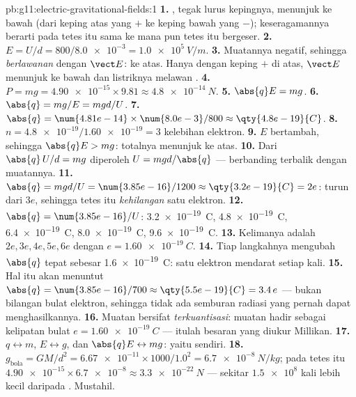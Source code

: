 \begin{solution}{pb:g11:electric-gravitational-fields:1}
\textbf{1.} , tegak lurus kepingnya, menunjuk ke bawah (dari
keping atas yang $+$ ke keping bawah yang $-$); keseragamannya berarti
 pada tetes itu sama ke mana pun tetes itu bergeser.
\textbf{2.} $E = U/d = 800 / \num{8.0e-3} = \qty{1.0e5}{V/m}$.
\textbf{3.} Muatannya negatif, sehingga  \emph{berlawanan}
dengan $\vect E$: ke atas. Hanya dengan keping $+$ di atas, $\vect E$
menunjuk ke bawah dan  listriknya melawan .
\textbf{4.} $P = mg = \num{4.90e-15} \times 9.81 \approx
\qty{4.8e-14}{N}$.
\textbf{5.} $\abs{q}E = mg$.
\textbf{6.} $\abs{q} = mg/E = mgd/U$.
\textbf{7.} $\abs{q} = \num{4.81e-14} \times \num{8.0e-3} / 800
\approx \qty{4.8e-19}{C}$.
\textbf{8.} $n = \num{4.8e-19} / \num{1.60e-19} = 3$ kelebihan
elektron.
\textbf{9.} $E$ bertambah, sehingga $\abs{q}E > mg$:  totalnya
menunjuk ke atas.
\textbf{10.} Dari $\abs{q}\,U/d = mg$ diperoleh $U = mgd/\abs{q}$ ---
berbanding terbalik dengan muatannya.
\textbf{11.} $\abs{q} = mgd/U = \num{3.85e-16}/1200 \approx
\qty{3.2e-19}{C} = 2e$: turun dari $3e$, sehingga tetes itu
\emph{kehilangan} satu elektron.
\textbf{12.} $\abs{q} = \num{3.85e-16}/U$: \qty{3.2e-19}{C},
\qty{4.8e-19}{C}, \qty{6.4e-19}{C}, \qty{8.0e-19}{C},
\qty{9.6e-19}{C}.
\textbf{13.} Kelimanya adalah $2e, 3e, 4e, 5e, 6e$ dengan
$e = \qty{1.60e-19}{C}$.
\textbf{14.} Tiap langkahnya mengubah $\abs{q}$ tepat sebesar
\qty{1.6e-19}{C}: satu elektron mendarat setiap kali.
\textbf{15.} Hal itu akan menuntut $\abs{q} = \num{3.85e-16}/700 \approx
\qty{5.5e-19}{C} = 3.4\,e$ --- bukan bilangan bulat elektron,
sehingga tidak ada semburan radiasi yang pernah dapat menghasilkannya.
\textbf{16.} Muatan bersifat \emph{terkuantisasi}: muatan hadir sebagai
kelipatan bulat  $e = \qty{1.60e-19}{C}$ --- itulah besaran
yang diukur Millikan.
\textbf{17.} $q \leftrightarrow m$, $E \leftrightarrow g$, dan
$\abs{q}E \leftrightarrow mg$: yaitu  sendiri.
\textbf{18.} $g_{\text{bola}} = GM/d^2 = \num{6.67e-11} \times 1000 /
1.0^2 = \qty{6.7e-8}{N/kg}$;  pada tetes itu
$\num{4.90e-15} \times \num{6.7e-8} \approx \qty{3.3e-22}{N}$ ---
sekitar $\num{1.5e8}$ kali lebih kecil daripada . Mustahil.

\end{solution}
